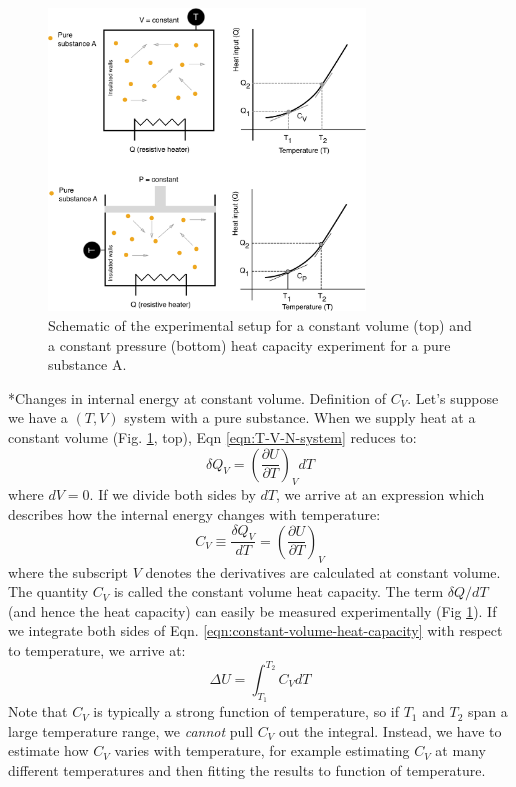\documentclass[11pt]{article}
\makeatletter
\theoremstyle{definition}
\renewcommand\subsubsection{\@startsection
	{subsubsection}{2}{0mm}
	{-0.05in}
	{-0.5\baselineskip}
	{\normalfont\normalsize\itshape}}
\makeatother
\begin{document}
\begin{figure}\center
	\includegraphics[width=0.75\textwidth]{./figs/HeatCapacity-eps-converted-to.pdf}
	\caption{Schematic of the experimental setup for a constant volume (top) and a constant pressure (bottom) heat capacity experiment for a pure substance A.}\label{fig-heat-capacity}
\end{figure}

\subsubsection*{Changes in internal energy at constant volume. Definition of $C_{V}$.}
Let's suppose we have a $\left(T,V\right)$ system with a pure substance.
When we supply heat at a constant volume (Fig. \ref{fig-heat-capacity}, top), Eqn \eqref{eqn:T-V-N-system} reduces to:
\begin{equation}
	\delta{Q}_{V} = \left(\frac{\partial{U}}{\partial{T}}\right)_{V}dT
\end{equation}where $dV = 0$. If we divide both sides by $dT$, we arrive at an expression which describes how the internal energy changes with temperature:
\begin{equation}\label{eqn:constant-volume-heat-capacity}
	C_{V} \equiv \frac{\delta{Q}_{V}}{dT} = \left(\frac{\partial{U}}{\partial{T}}\right)_{V}
\end{equation}where the subscript $V$ denotes the derivatives are calculated at constant volume. The quantity $C_{V}$ is called the constant volume heat capacity.
The term $\delta{Q}/{dT}$ (and hence the heat capacity) can easily be measured experimentally (Fig \ref{fig-heat-capacity}). If we integrate both sides of
Eqn. \eqref{eqn:constant-volume-heat-capacity} with respect to temperature, we arrive at:
\begin{equation}
	\Delta{U} = \int_{T_{1}}^{T_{2}}C_{V}dT
\end{equation}Note that $C_{V}$ is typically a strong function of temperature, so if $T_{1}$ and $T_{2}$ span a large temperature range, we \textit{cannot} pull $C_{V}$ out the integral.
Instead, we have to estimate how $C_{V}$ varies with temperature, for example estimating $C_{V}$ at many different temperatures and then fitting the results to function of temperature.
\end{document}
